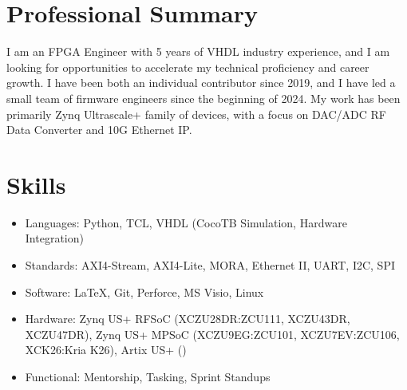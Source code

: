 \documentclass[10pt,final,sans]{resume}
\begin{document}
\setlength\headheight{28pt} %

\section{Professional Summary}
\raggedright{I am an FPGA Engineer with 5 years of VHDL industry experience, and I am looking for opportunities to accelerate my technical proficiency and career growth. I have been both an individual contributor since 2019, and I have led a small team of firmware engineers since the beginning of 2024. My work has been primarily Zynq Ultrascale+ family of devices, with a focus on DAC/ADC RF Data Converter and 10G Ethernet IP.}

\section{Skills}
\begin{itemize}
  \item Languages: Python, TCL, VHDL (CocoTB Simulation, Hardware Integration)
  \item Standards: AXI4-Stream, AXI4-Lite, MORA, Ethernet II, UART, I2C, SPI
  \item Software: {\textrm \LaTeX}, Git, Perforce, MS Visio, Linux
  \item Hardware: Zynq US+ RFSoC (XCZU28DR:ZCU111, XCZU43DR, XCZU47DR), Zynq US+ MPSoC (XCZU9EG:ZCU101, XCZU7EV:ZCU106, XCK26:Kria K26), Artix US+ ()
  \item Functional: Mentorship, Tasking, Sprint Standups
\end{itemize}
\end{document}
